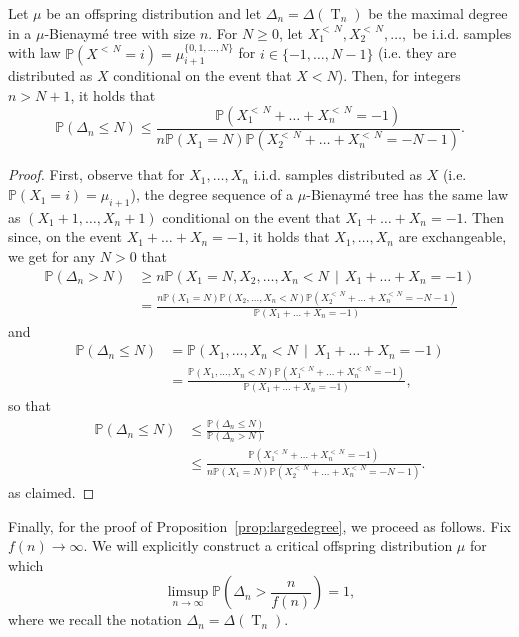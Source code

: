 \documentclass[AHL,Unicode,longabstracts,published]{cedram}
\renewcommand{\P}{\mathbb{P}}
\DeclareMathOperator{\rtree}{T}
\begin{document}
\begin{lemm}\label{lem:large_degree_is_large}
Let $\mu$ be an offspring distribution and let $\Delta_n=\Delta(\rtree_n)$ be the maximal degree in a $\mu$-Bienaymé tree with size $n$. For $N\geq 0$, let $X^{<\,N}_1,X^{<\,N}_2,\dots,$ be i.i.d. samples with law $\P(X^{<\,N}=i)=\mu^{\{0,1,\dots,N\}}_{i+1}$ for $i \in \{-1,\dots,N-1\}$ (i.e. they are distributed as $X$ conditional on the event that $X<N$). Then, for integers $n>N+1$, it holds that
\[
\P(\Delta_n\leq N) \leq \frac{ \P\left(X^{<\,N}_1+\dots+X^{<\,N}_n=-1\right)}{n \P(X_1=N)\P\left(X^{<\,N}_2+\dots+X^{<\,N}_n=-N-1\right)}.
\]
\end{lemm}
\begin{proof}
First, observe that for $X_1,\dots,X_n$ i.i.d. samples distributed as $X$ (i.e. $\P(X_1=i)=\mu_{i+1}$), the degree sequence of a $\mu$-Bienaymé tree has the same law as $(X_1+1,\dots,X_n+1)$ conditional on the event that $X_1+\dots+X_n=-1$. Then since, on the event $X_1+\dots+X_n=-1$, it holds that $X_1,\dots, X_n$ are exchangeable, we get for any $N>0$ that
\begin{align*}
\P(\Delta_n> N)&\geq n \P\left(X_1=N, X_2,\dots, X_n<N \,\middle|\, X_1+\dots+X_n=-1\right)\\
&= \frac{n \P(X_1=N)\P(X_2,\dots,X_n<N)\P\left(X^{<\,N}_2+\dots+X^{<\,N}_n=-N-1\right)}{\P(X_1+\dots+X_n=-1)}
\end{align*}
and
\begin{align*}
\P(\Delta_n\leq N)&= \P\left(X_1,\dots,X_n< N \,\middle| \,X_1+\dots+X_n=-1\right)\\
&= \frac{\P(X_1,\dots,X_n<N)\P\left(X^{<\,N}_1+\dots+X^{<\,N}_n=-1\right)}{\P(X_1+\dots+X_n=-1)},
\end{align*}
so that
\begin{align*}
\P(\Delta_n\leq N)&\leq \frac{\P(\Delta_n\leq N)}{\P(\Delta_n> N) } \\
&\leq \frac{ \P\left(X^{<\,N}_1+\dots+X^{<\,N}_n=-1\right)}{n \P(X_1=N)\P\left(X^{<\,N}_2+\dots+X^{<\,N}_n=-N-1\right)}.
\end{align*}
as claimed.
\end{proof}

Finally, for the proof of Proposition~\ref{prop:largedegree}, we proceed as follows. Fix $f(n)\to \infty$. We will explicitly construct a critical offspring distribution $\mu$ for which
\begin{equation}\label{eq:Delta}
\limsup_{n\to\infty}\P\left(\Delta_{n}>\frac{n}{f(n)}\right)=1,
\end{equation}
where we recall the notation $\Delta_n=\Delta(\rtree_n)$.
\end{document}
